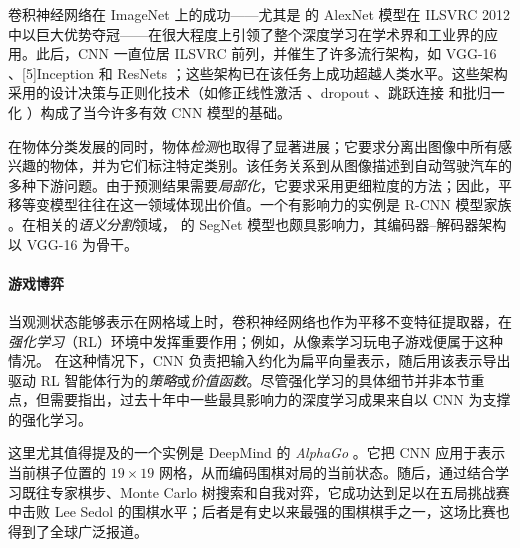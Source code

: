 卷积神经网络在 ImageNet 上的成功——尤其是 \citet{krizhevsky2012imagenet} 的 AlexNet 模型在 ILSVRC 2012 中以巨大优势夺冠——在很大程度上引领了整个深度学习在学术界和工业界的应用。此后，CNN 一直位居 ILSVRC 前列，并催生了许多流行架构，如 VGG-16 \citep{simonyan2014very}、[5\baselineskip]Inception \citep{szegedy2015going} 和 ResNets \citep{he2016deep}；这些架构已在该任务上成功超越人类水平。这些架构采用的设计决策与正则化技术（如修正线性激活 \citep{nair2010rectified}、dropout \citep{srivastava2014dropout}、跳跃连接 \citep{he2016deep} 和批归一化 \citep{ioffe2015batch}）构成了当今许多有效 CNN 模型的基础。

在物体分类发展的同时，物体\emph{检测}也取得了显著进展；它要求分离出图像中所有感兴趣的物体，并为它们标注特定类别。该任务关系到从图像描述到自动驾驶汽车的多种下游问题。由于预测结果需要\emph{局部化}，它要求采用更细粒度的方法；因此，平移等变模型往往在这一领域体现出价值。一个有影响力的实例是 R-CNN 模型家族 \citep{girshick2014rich,girshick2015fast,ren2015faster,he2017mask}。在相关的\emph{语义分割}领域，\citet{badrinarayanan2017segnet} 的 SegNet 模型也颇具影响力，其编码器--解码器架构以 VGG-16 为骨干。

\paragraph{游戏博弈} 当观测状态能够表示在网格域上时，卷积神经网络也作为平移不变特征提取器，在\emph{强化学习}（RL）环境中发挥重要作用；例如，从像素学习玩电子游戏便属于这种情况。%
%
在这种情况下，CNN 负责把输入约化为扁平向量表示，随后用该表示导出驱动 RL 智能体行为的\emph{策略}或\emph{价值函数}。尽管强化学习的具体细节并非本节重点，但需要指出，过去十年中一些最具影响力的深度学习成果来自以 CNN 为支撑的强化学习。

这里尤其值得提及的一个实例是 DeepMind 的 \emph{AlphaGo} \citep{silver2016mastering}。它把 CNN 应用于表示当前棋子位置的 $19\times 19$ 网格，从而编码围棋对局的当前状态。随后，通过结合学习既往专家棋步、Monte Carlo 树搜索和自我对弈，它成功达到足以在五局挑战赛中击败 Lee Sedol 的围棋水平；后者是有史以来最强的围棋棋手之一，这场比赛也得到了全球广泛报道。

